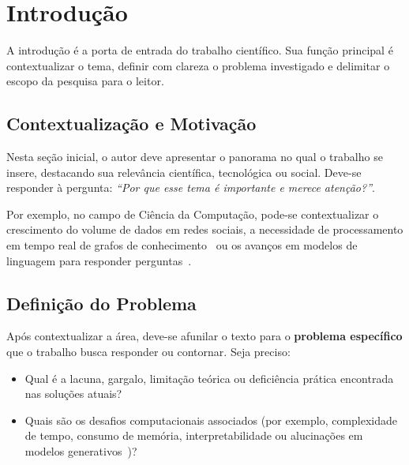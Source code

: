 \documentclass[cic,tc,biblatex]{iiufrgs}
\begin{document}
\tableofcontents


\chapter{Introdução}
\label{cap:introducao}

A introdução é a porta de entrada do trabalho científico. Sua função principal é contextualizar o tema, definir com clareza o problema investigado e delimitar o escopo da pesquisa para o leitor.

\section{Contextualização e Motivação}
\label{sec:contexto}

Nesta seção inicial, o autor deve apresentar o panorama no qual o trabalho se insere, destacando sua relevância científica, tecnológica ou social. Deve-se responder à pergunta: \emph{``Por que esse tema é importante e merece atenção?''}.

Por exemplo, no campo de Ciência da Computação, pode-se contextualizar o crescimento do volume de dados em redes sociais, a necessidade de processamento em tempo real de grafos de conhecimento~\cite{kg_neo4j} ou os avanços em modelos de linguagem para responder perguntas~\cite{Su2019, wei2022chain}.

\section{Definição do Problema}
\label{sec:problema}

Após contextualizar a área, deve-se afunilar o texto para o \textbf{problema específico} que o trabalho busca responder ou contornar. Seja preciso:
\begin{itemize}
    \item Qual é a lacuna, gargalo, limitação teórica ou deficiência prática encontrada nas soluções atuais?
    \item Quais são os desafios computacionais associados (por exemplo, complexidade de tempo, consumo de memória, interpretabilidade ou alucinações em modelos generativos~\cite{xu2024hallucination})?
\end{itemize}
\end{document}
